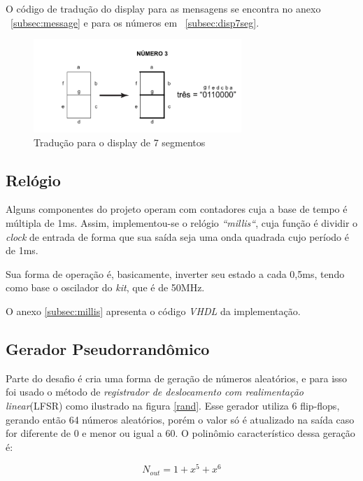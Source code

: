 \documentclass[12pt]{article}
\begin{document}
O código de tradução do display para as mensagens se encontra no anexo  ~\ref{subsec:message} e para os números em  ~\ref{subsec:disp7seg}.

\clearpage

\begin{figure}[!h]
    \centering
    \includegraphics[width=0.7\textwidth]{img/disp.png}
    \caption{Tradução para o display de 7 segmentos}
    \label{fig:disp}
\end{figure}


\subsection{Relógio}
Alguns componentes do projeto operam com contadores cuja a base de tempo é múltipla de 1ms. Assim, implementou-se o relógio \emph{``millis``}, cuja função é dividir o \emph{clock} de entrada de forma que sua saída seja uma onda quadrada cujo período é de 1ms.

Sua forma de operação é, basicamente, inverter seu estado a cada 0,5ms, tendo como base o oscilador do \emph{kit}, que é de 50MHz.

O anexo \ref{subsec:millis} apresenta o código \emph{VHDL} da implementação.

\subsection{Gerador Pseudorrandômico}
Parte do desafio é cria uma forma de geração de números aleatórios, e para isso foi usado o método de \textit{registrador de deslocamento com realimentação linear}(LFSR) como ilustrado na figura \ref{rand}. Esse gerador utiliza 6 flip-flops, gerando então 64 números aleatórios, porém o valor só é atualizado na saída caso for diferente de 0 e menor ou igual a 60. O polinômio característico dessa geração é:

\begin{equation}
    N_{out} = 1 + x^5 + x^6
\end{equation}
\end{document}
